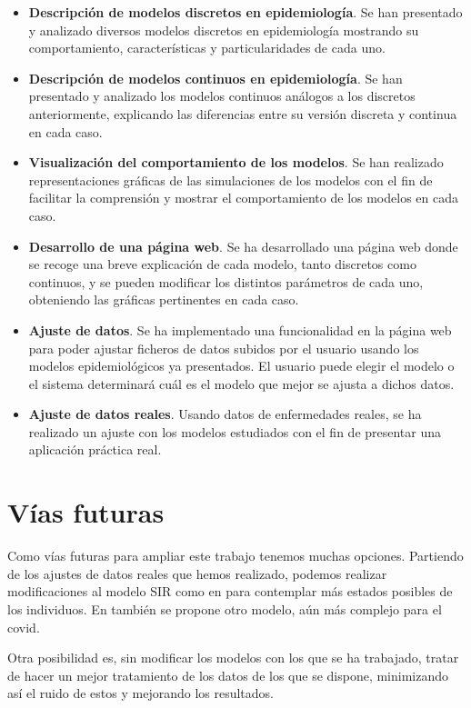\begin{itemize}
\item \textbf{Descripción de modelos discretos en epidemiología}. Se han presentado y analizado diversos modelos discretos en epidemiología mostrando su comportamiento, características y particularidades de cada uno.
\item \textbf{Descripción de modelos continuos en epidemiología}. Se han presentado y analizado los modelos continuos análogos a los discretos anteriormente, explicando las diferencias entre su versión discreta y continua en cada caso.
\item \textbf{Visualización del comportamiento de los modelos}. Se han realizado representaciones gráficas de las simulaciones de los modelos con el fin de facilitar la comprensión y mostrar el comportamiento de los modelos en cada caso.
\item \textbf{Desarrollo de una página web}. Se ha desarrollado una página web donde se recoge una breve explicación de cada modelo, tanto discretos como continuos, y se pueden modificar los distintos parámetros de cada uno, obteniendo las gráficas pertinentes en cada caso.
\item \textbf{Ajuste de datos}. Se ha implementado una funcionalidad en la página web para poder ajustar ficheros de datos subidos por el usuario usando los modelos epidemiológicos ya presentados. El usuario puede elegir el modelo o el sistema determinará cuál es el modelo que mejor se ajusta a dichos datos.
\item \textbf{Ajuste de datos reales}. Usando datos de enfermedades reales, se ha realizado un ajuste con los modelos estudiados con el fin de presentar una aplicación práctica real.
\end{itemize}

\section{Vías futuras}

Como vías futuras para ampliar este trabajo tenemos muchas opciones. Partiendo de los ajustes de datos reales que hemos realizado, podemos realizar modificaciones al modelo SIR como en \cite{gutierrez2020analisis} para contemplar más estados posibles de los individuos. En \cite{RAMOS2021105937} también se propone otro modelo, aún más complejo para el covid.

Otra posibilidad es, sin modificar los modelos con los que se ha trabajado, tratar de hacer un mejor tratamiento de los datos de los que se dispone, minimizando así el ruido de estos y mejorando los resultados.

